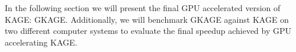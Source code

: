 In the following section we will present the final GPU accelerated version of KAGE: GKAGE. 
Additionally, we will benchmark GKAGE against KAGE on two different computer systems to evaluate the final speedup achieved by GPU accelerating KAGE.

